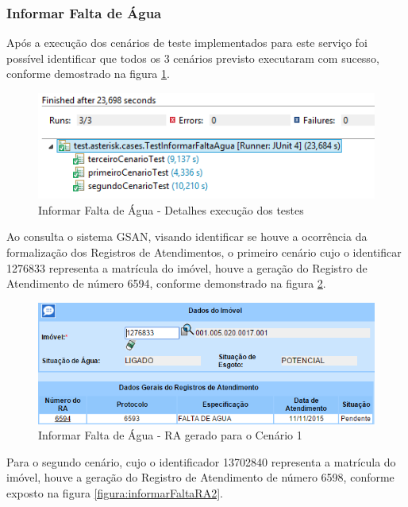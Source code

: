 	
\subsubsection{Informar Falta de Água}

 Após a execução dos cenários de teste implementados para este serviço foi possível identificar que todos os 3 cenários previsto executaram com sucesso, conforme demostrado na figura \ref{figura:informarFaltaJUnit}.	

	\begin{figure}[H]
		\centering
		\caption{Informar Falta de Água - Detalhes execução dos testes}
		\label{figura:informarFaltaJUnit}
		\includegraphics{figuras/cenarios/informar_falta_agua/junit_result.PNG}
	\end{figure}

Ao consulta o sistema GSAN, visando identificar se houve a ocorrência da formalização dos Registros de Atendimentos, o primeiro cenário cujo o identificar 1276833 representa a matrícula do imóvel, houve a geração do Registro de Atendimento de número 6594, conforme demonstrado na figura \ref{figura:informarFaltaRA1}.

	\begin{figure}[H]
		\centering
		\caption{Informar Falta de Água - RA gerado para o Cenário 1}
		\label{figura:informarFaltaRA1}
		\includegraphics{figuras/cenarios/informar_falta_agua/resultado_1.PNG}
	\end{figure}
	
Para o segundo cenário, cujo o identificador 13702840 representa a matrícula do imóvel, houve a geração do Registro de Atendimento de número 6598, conforme exposto na figura \ref{figura:informarFaltaRA2}.	
		
